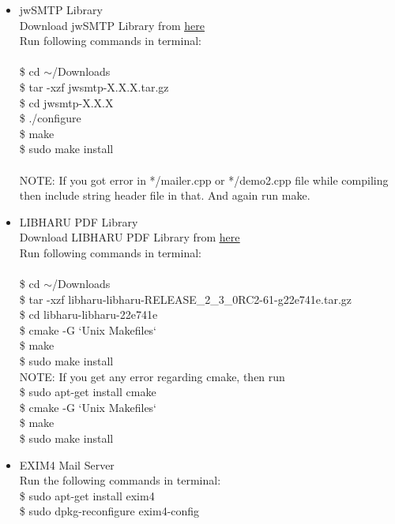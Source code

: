 \begin{itemize}
\item jwSMTP Library\\
\tab Download jwSMTP Library from
\href{http://sourceforge.net/projects/jwsmtp/files/latest/download}{\underline{here}}\\
\tab Run following commands in terminal:\\\\
\tab \$ cd $\sim$/Downloads \\
\tab \$ tar -xzf jwsmtp-X.X.X.tar.gz \\
\tab \$ cd jwsmtp-X.X.X \\
\tab \$ ./configure \\
\tab \$ make \\
\tab \$ sudo make install \\\\
NOTE: If you got error in */mailer.cpp or */demo2.cpp file while compiling then
include string header file in that. And again run make.\\

\item LIBHARU PDF Library\\
\tab Download LIBHARU PDF Library from 
\href{https://github.com/libharu/libharu/tarball/master}{\underline{here}}\\
\tab Run following commands in terminal:\\\\
\tab \$ cd $\sim$/Downloads\\
\tab \$ tar -xzf libharu-libharu-RELEASE\_2\_3\_0RC2-61-g22e741e.tar.gz\\
\tab \$ cd libharu-libharu-22e741e\\
\tab \$ cmake -G `Unix Makefiles` \\
\tab \$ make\\
\tab \$ sudo make install\\

NOTE: If you get any error regarding cmake, then run\\
\tab \$ sudo apt-get install cmake \\
\tab \$ cmake -G `Unix Makefiles`\\
\tab \$ make\\
\tab \$ sudo make install\\

\item  EXIM4 Mail Server\\
\tab Run the following commands in terminal:\\

\tab \$ sudo apt-get install exim4\\
\tab \$ sudo dpkg-reconfigure exim4-config\\


\end{itemize}
